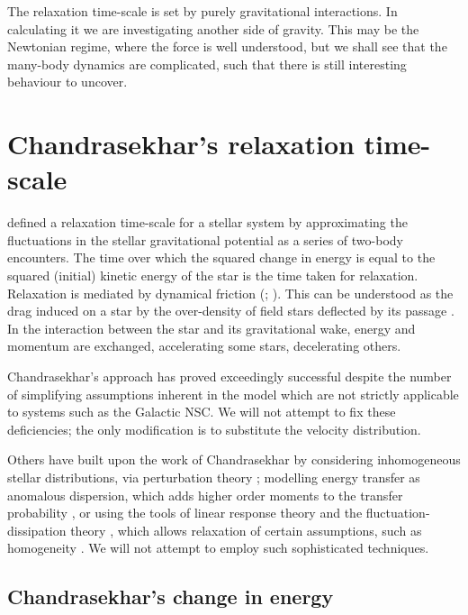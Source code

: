 The relaxation time-scale is set by purely gravitational interactions. In calculating it we are investigating another side of gravity. This may be the Newtonian regime, where the force is well understood, but we shall see that the many-body dynamics are complicated, such that there is still interesting behaviour to uncover.

\section{Chandrasekhar's relaxation time-scale}\label{sec:time-scale}

\citet[chapter 2]{Chandrasekhar1960} defined a relaxation time-scale for a stellar system by approximating the fluctuations in the stellar gravitational potential as a series of two-body encounters. The time over which the squared change in energy is equal to the squared (initial) kinetic energy of the star is the time taken for relaxation. Relaxation is mediated by dynamical friction (\citealt{Chandrasekhar1943a}; \citealt[section 1.2]{Binney2008}). This can be understood as the drag induced on a star by the over-density of field stars deflected by its passage \citep{Mulder1983}. In the interaction between the star and its gravitational wake, energy and momentum are exchanged, accelerating some stars, decelerating others.

Chandrasekhar's approach has proved exceedingly successful despite the number of simplifying assumptions inherent in the model which are not strictly applicable to systems such as the Galactic NSC. We will not attempt to fix these deficiencies; the only modification is to substitute the velocity distribution.

Others have built upon the work of Chandrasekhar by considering inhomogeneous stellar distributions, via perturbation theory \citep{Lynden-Bell1972,Tremaine1984,Weinberg1986}; modelling energy transfer as anomalous dispersion, which adds higher order moments to the transfer probability \citep{Bar-Or2012}, or using the tools of linear response theory and the fluctuation-dissipation theory \citep[chapter 7]{Landau1958}, which allows relaxation of certain assumptions, such as homogeneity \citep{Bekenstein1992,Maoz1993,Nelson1999}. We will not attempt to employ such sophisticated techniques.

\subsection{Chandrasekhar's change in energy}

